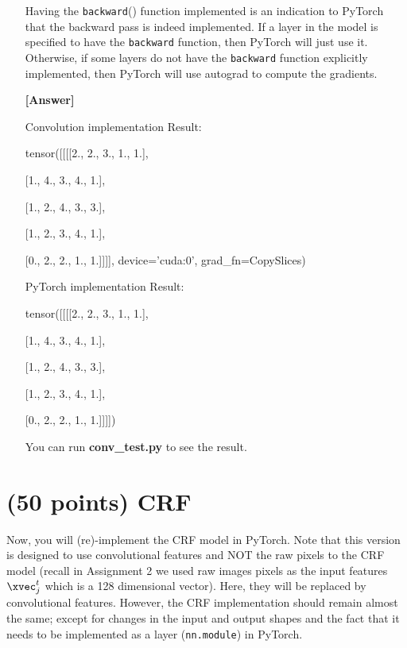\documentclass[11pt]{report}
\begin{document}
\begin{itemize}

Having the \verb#backward#() function implemented is an indication to PyTorch that the backward pass is indeed implemented. If a layer in the model is specified to have the \verb#backward# function, then PyTorch will just use it.
Otherwise, if some layers do not have the \verb#backward# function explicitly implemented,
then PyTorch will use autograd to compute the gradients.


\item[\textbf{ [Answer] } ]{
Convolution implementation Result:

tensor([[[[2., 2., 3., 1., 1.],

          [1., 4., 3., 4., 1.],

          [1., 2., 4., 3., 3.],

          [1., 2., 3., 4., 1.],

          [0., 2., 2., 1., 1.]]]], device='cuda:0', grad\_fn=\<CopySlices\>)


PyTorch implementation Result:

tensor([[[[2., 2., 3., 1., 1.],

          [1., 4., 3., 4., 1.],

          [1., 2., 4., 3., 3.],

          [1., 2., 3., 4., 1.],

          [0., 2., 2., 1., 1.]]]])


You can run \textbf{conv\_test.py} to see the result.
}

\end{itemize}

\section{(50 points) CRF}

Now, you will (re)-implement the CRF model in PyTorch. Note that this version is
designed to use convolutional features and NOT the raw pixels to the CRF model
(recall in Assignment 2 we used raw images pixels as the input features
$\xvec^{t}_{j}$ which is a 128 dimensional vector). Here, they will be replaced
by convolutional features. However, the CRF implementation should remain almost
the same; except for changes in the input and output shapes and the fact that it
needs to be implemented as a layer (\texttt{nn.module}) in PyTorch.
\end{document}
